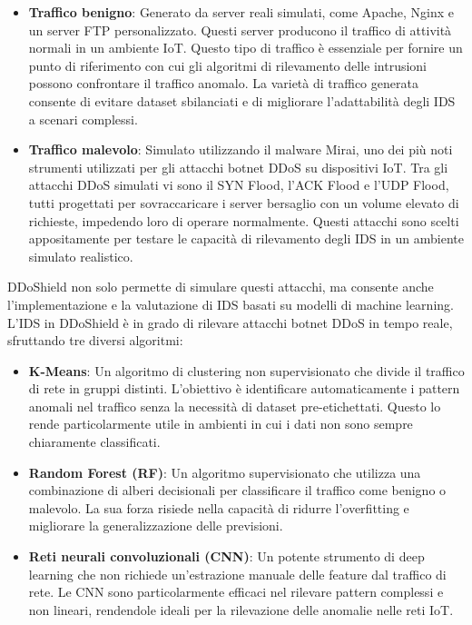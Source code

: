 \begin{itemize}
    \item \textbf{Traffico benigno}: Generato da server reali simulati, come Apache, Nginx e un server FTP personalizzato. Questi server producono il traffico di attività normali in un ambiente IoT. Questo tipo di traffico è essenziale per fornire un punto di riferimento con cui gli algoritmi di rilevamento delle intrusioni possono confrontare il traffico anomalo. La varietà di traffico generata consente di evitare dataset sbilanciati e di migliorare l’adattabilità degli IDS a scenari complessi.
    \item \textbf{Traffico malevolo}: Simulato utilizzando il malware Mirai, uno dei più noti strumenti utilizzati per gli attacchi botnet DDoS su dispositivi IoT. Tra gli attacchi DDoS simulati vi sono il SYN Flood, l'ACK Flood e l'UDP Flood, tutti progettati per sovraccaricare i server bersaglio con un volume elevato di richieste, impedendo loro di operare normalmente. Questi attacchi sono scelti appositamente per testare le capacità di rilevamento degli IDS in un ambiente simulato realistico.
\end{itemize}

DDoShield non solo permette di simulare questi attacchi, ma consente anche l'implementazione e la valutazione di IDS basati su modelli di machine learning. L'IDS in DDoShield è in grado di rilevare attacchi botnet DDoS in tempo reale, sfruttando tre diversi algoritmi:

\begin{itemize}
    \item \textbf{K-Means}: Un algoritmo di clustering non supervisionato che divide il traffico di rete in gruppi distinti. L'obiettivo è identificare automaticamente i pattern anomali nel traffico senza la necessità di dataset pre-etichettati. Questo lo rende particolarmente utile in ambienti in cui i dati non sono sempre chiaramente classificati.
    \item \textbf{Random Forest (RF)}: Un algoritmo supervisionato che utilizza una combinazione di alberi decisionali per classificare il traffico come benigno o malevolo. La sua forza risiede nella capacità di ridurre l'overfitting e migliorare la generalizzazione delle previsioni.
    \item \textbf{Reti neurali convoluzionali (CNN)}: Un potente strumento di deep learning che non richiede un'estrazione manuale delle feature dal traffico di rete. Le CNN sono particolarmente efficaci nel rilevare pattern complessi e non lineari, rendendole ideali per la rilevazione delle anomalie nelle reti IoT.
\end{itemize}

